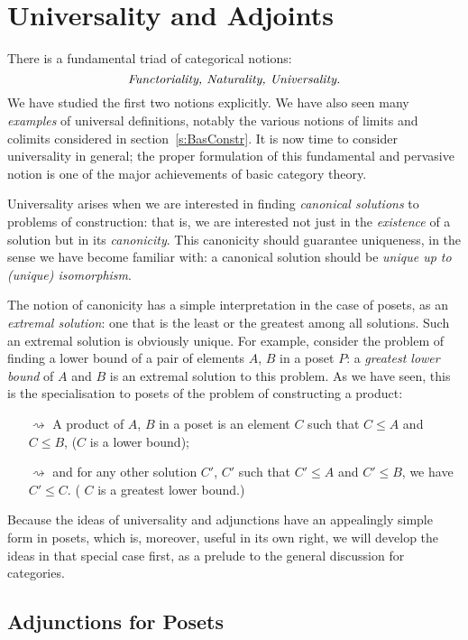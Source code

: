 \documentclass{svmult}
\begin{document}
\section{Universality and Adjoints}\label{s:Univ}

There is a fundamental triad of categorical notions:
\[ \text{\emph{Functoriality, Naturality, Universality.}} \]
%
We have studied the first two notions explicitly. We have also seen many \emph{examples} of universal definitions, notably the various notions of limits and colimits considered in section~\ref{s:BasConstr}. It is now time to consider universality in general; the proper formulation of this fundamental and pervasive notion is one of the major achievements of basic category theory.

Universality arises when we are interested in finding \emph{canonical solutions} to problems of construction: that is, we are interested not just in the \emph{existence} of a solution but in its \emph{canonicity}. This canonicity should guarantee uniqueness, in the sense we have become familiar with: a canonical solution should be \emph{unique up to (unique) isomorphism}.

The notion of canonicity has a simple interpretation in the case of posets, as an \emph{extremal solution}: one that is the least or the greatest among all solutions. Such an extremal solution is obviously unique.
For example, consider the problem of finding a lower bound of a pair of elements $A$, $B$ in a poset $P$: a \emph{greatest lower bound} of $A$ and $B$ is an extremal solution to this problem. As we have seen, this is the specialisation to posets of the problem of constructing a product:
\begin{itemize}
\item[$\rightsquigarrow$] A product of $A$, $B$ in a poset is an element $C$ such that $C \leq A$ and $C\leq B$, ($C$ is a lower bound);
\item[$\rightsquigarrow$] and for any other solution $C'$, \ie $C'$ such that $C'\leq A$ and $C'\leq B$, we have $C'\leq C$.
    ( $C$ is a greatest lower bound.)
\end{itemize}
Because the ideas of universality and adjunctions have an appealingly simple form in posets, which is, moreover,  useful in its own right, we will develop the ideas in that special case first, as a prelude to the general discussion for categories.

\subsection{Adjunctions for Posets}
\end{document}
